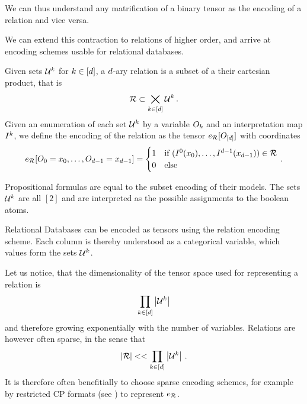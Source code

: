We can thus understand any matrification of a binary tensor as the encoding of a relation and vice versa.





We can extend this contraction to relations of higher order, and arrive at encoding schemes usable for relational databases.

\begin{definition}\label{def:daryRelation}
	Given sets $\mathcal{U}^{k}$ for $k\in[d]$, a $d$-ary relation is a subset of a their cartesian product, that is
		\[ \mathcal{R} \subset  \bigtimes_{k\in[d]} \mathcal{U}^{k} \, . \]
	Given an enumeration of each set $\mathcal{U}^{k}$ by a variable $O_{k}$ and an interpretation map $I^{k}$, we define the encoding of the relation as the tensor $e_{\mathcal{R}}[O_{[d]}]$ with coordinates
	\begin{align}
		e_{\mathcal{R}}[O_{0}=x_{0},\ldots,O_{d-1}=x_{d-1}]
		= \begin{cases}
		1 & \text{if } (I^{0}(x_{0}),\ldots,I^{d-1}(x_{d-1})) \in \mathcal{R} \\
		0 & \text{else}
		\end{cases} \, . 
	\end{align}
\end{definition}


\begin{example}
	Propositional formulas are equal to the subset encoding of their models.
	The sets $\mathcal{U}^{k}$ are all $[2]$ and are interpreted as the possible assignments to the boolean atoms.
\end{example}


\begin{example}
	Relational Databases can be encoded as tensors using the relation encoding scheme.
	Each column is thereby understood as a categorical variable, which values form the sets $\mathcal{U}^{k}$.
\end{example}

Let us notice, that the dimensionality of the tensor space used for representing a relation is 
	\[ \prod_{k\in[d]} \left|\mathcal{U}^{k}\right| \]
and therefore growing exponentially with the number of variables.
Relations are however often sparse, in the sense that 
	\[ \left|\mathcal{R}\right| << \prod_{k\in[d]} \left|\mathcal{U}^{k}\right| \, . \]
It is therefore often benefitially to choose sparse encoding schemes, for example by restricted CP formats (see ) to represent $e_{\mathcal{R}}$.

